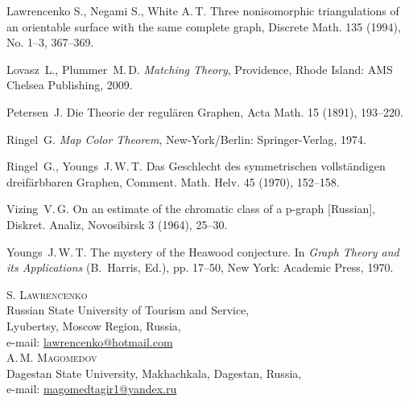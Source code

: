 \documentclass[12pt]{article}
\begin{document}
\begin{thebibliography}{99}
 Lawrencenko S., Negami S., White A.\,T. Three nonisomorphic triangulations of an orientable surface with the same complete graph, Discrete Math. 135 (1994), No. 1--3, 367--369. 

 Lovasz\ L., Plummer\ M.\,D. {\it Matching Theory}, Providence, Rhode Island: AMS Chelsea Publishing, 2009. 

 Petersen\ J. Die Theorie der regul\"aren Graphen, Acta Math. 15 (1891), 193--220.

 Ringel\ G. {\it Map Color Theorem}, New-York/Berlin: Springer-Verlag, 1974.

 Ringel\ G., Youngs\ J.\,W.\,T. Das Geschlecht des symmetrischen vollst\"andigen dreif\"arbbaren Graphen, Comment. Math. Helv. 45 (1970), 152--158.

 Vizing\ V.\,G. On an estimate of the chromatic class of a p-graph [Russian], Diskret. Analiz, Novosibirsk 3 (1964), 25--30.

 Youngs\ J.\,W.\,T. The mystery of the Heawood conjecture. In {\it Graph Theory and its
Applications} (B.\ Harris, Ed.), pp. 17--50, New York: Academic Press, 1970. 
\end{thebibliography}

\par\medskip 
\par\medskip 
\par\medskip 

\noindent \textsc{S. Lawrencenko} \\
\noindent Russian State University of Tourism and Service,\\
\noindent Lyubertsy, Moscow Region, Russia,\\
\noindent e-mail: \url{lawrencenko@hotmail.com}\\

\noindent \textsc{A.\,M. Magomedov} \\
\noindent Dagestan State University, Makhachkala, Dagestan, Russia,\\
\noindent e-mail: \url{magomedtagir1@yandex.ru}
\end{document}

